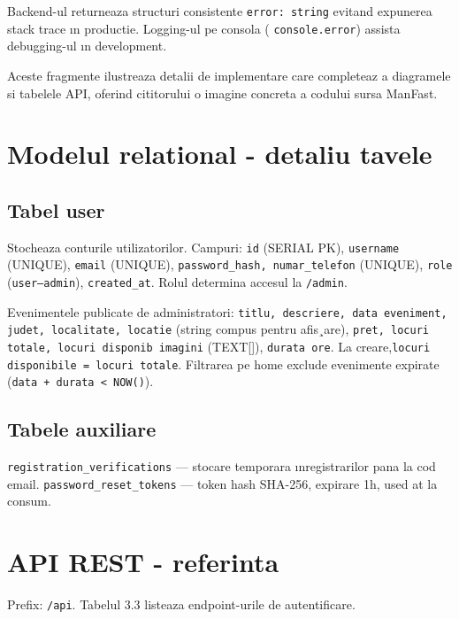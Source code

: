  Backend-ul returneaza structuri consistente {{\tt error: string} } evitand expunerea stack trace ın productie. Logging-ul pe consola ( {\tt console.error}) assista debugging-ul ın development.

 Aceste fragmente ilustreaza detalii de implementare care completeaz a diagramele si tabelele API, oferind cititorului o imagine concreta a codului sursa ManFast. 
 
 \section{Modelul relational - detaliu tavele}
 \subsection{Tabel user}
 
 Stocheaza conturile utilizatorilor. Campuri: {\tt id} (SERIAL PK), {\tt username} (UNIQUE), {\tt email} (UNIQUE), {\tt password\_hash, numar\_telefon} (UNIQUE), {\tt role} ({\tt user—admin}), {\tt created\_at}. Rolul determina accesul la  {\tt /admin}.
 
 Evenimentele publicate de administratori: {\tt titlu, descriere, data eveniment, judet,
 localitate, locatie} (string compus pentru afis¸are), {\tt pret, locuri totale, locuri disponib imagini} (TEXT[]), {\tt durata ore}. La creare,{\tt locuri disponibile = locuri totale}. Filtrarea pe home exclude evenimente expirate ({\tt data + durata < NOW()}).
 
\subsection{Tabele auxiliare}
	 
{\tt registration\_verifications} — stocare temporara ınregistrarilor pana la cod email. 
{\tt password\_reset\_tokens} — token hash SHA-256, expirare 1h, used at la consum.
	
\section{API REST - referinta}

Prefix: {\tt /api}. Tabelul 3.3 listeaza endpoint-urile de autentificare.


